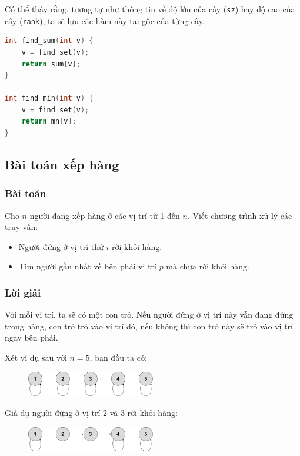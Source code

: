 \documentclass{article}
\begin{document}
Có thể thấy rằng, tương tự như thông tin về độ lớn của cây (\texttt{sz}) hay độ cao của cây (\texttt{rank}), ta sẽ lưu các hàm này tại gốc của từng cây.

\begin{lstlisting}[language=C++]
int find_sum(int v) {
    v = find_set(v);
    return sum[v];
}

int find_min(int v) { 
    v = find_set(v);
    return mn[v];
}
\end{lstlisting}

\subsection*{Bài toán xếp hàng}

\subsubsection*{Bài toán}

Cho \( n \) người đang xếp hàng ở các vị trí từ 1 đến \( n \). Viết chương trình xử lý các truy vấn:

\begin{itemize}
    \item Người đứng ở vị trí thứ \( i \) rời khỏi hàng.
    \item Tìm người gần nhất về bên phải vị trí \( p \) mà chưa rời khỏi hàng.
\end{itemize}

\subsubsection*{Lời giải}

Với mỗi vị trí, ta sẽ có một con trỏ. Nếu người đứng ở vị trí này vẫn đang đứng trong hàng, con trỏ trỏ vào vị trí đó, nếu không thì con trỏ này sẽ trỏ vào vị trí ngay bên phải.

Xét ví dụ sau với \( n = 5 \), ban đầu ta có:

\begin{figure}[h]
    \centering
    \includegraphics[width=0.5\textwidth]{img/b8/disjoint-set-union_img3.png}
\end{figure}

Giả dụ người đứng ở vị trí 2 và 3 rời khỏi hàng:

\begin{figure}[h]
    \centering
    \includegraphics[width=0.5\textwidth]{img/b8/disjoint-set-union_img4.png}
\end{figure}
\end{document}

